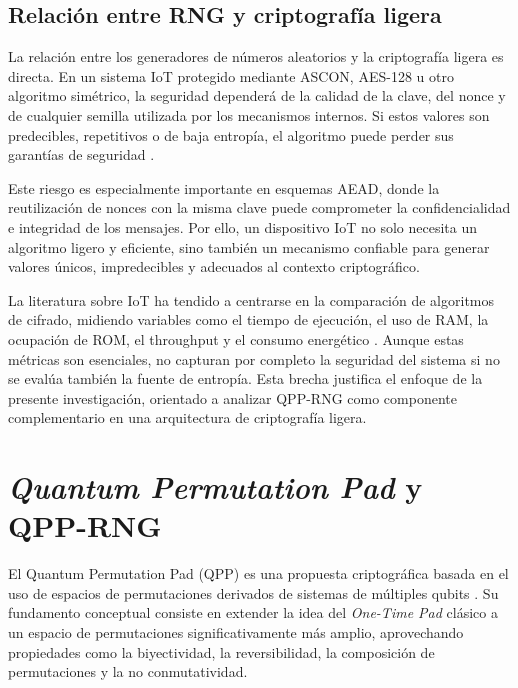 \subsection{Relación entre RNG y criptografía ligera}

La relación entre los generadores de números aleatorios y la criptografía ligera es directa. En un sistema IoT protegido mediante ASCON, AES-128 u otro algoritmo simétrico, la seguridad dependerá de la calidad de la clave, del nonce y de cualquier semilla utilizada por los mecanismos internos. Si estos valores son predecibles, repetitivos o de baja entropía, el algoritmo puede perder sus garantías de seguridad \cite{MITRE2024CWE-327:Algorithm}.

Este riesgo es especialmente importante en esquemas AEAD, donde la reutilización de nonces con la misma clave puede comprometer la confidencialidad e integridad de los mensajes. Por ello, un dispositivo IoT no solo necesita un algoritmo ligero y eficiente, sino también un mecanismo confiable para generar valores únicos, impredecibles y adecuados al contexto criptográfico.

La literatura sobre IoT ha tendido a centrarse en la comparación de algoritmos de cifrado, midiendo variables como el tiempo de ejecución, el uso de RAM, la ocupación de ROM, el throughput y el consumo energético \cite{Thakor2021LightweightOpportunities,Radhakrishnan2024EfficiencyDevices}. Aunque estas métricas son esenciales, no capturan por completo la seguridad del sistema si no se evalúa también la fuente de entropía. Esta brecha justifica el enfoque de la presente investigación, orientado a analizar QPP-RNG como componente complementario en una arquitectura de criptografía ligera.


\section{\textit{Quantum Permutation Pad} y QPP-RNG}

El Quantum Permutation Pad (QPP) es una propuesta criptográfica basada en el uso de espacios de permutaciones derivados de sistemas de múltiples qubits \cite{Kuang2022QuantumCryptography,Kuang2021QuantumPad}. Su fundamento conceptual consiste en extender la idea del \textit{One-Time Pad} clásico a un espacio de permutaciones significativamente más amplio, aprovechando propiedades como la biyectividad, la reversibilidad, la composición de permutaciones y la no conmutatividad.

